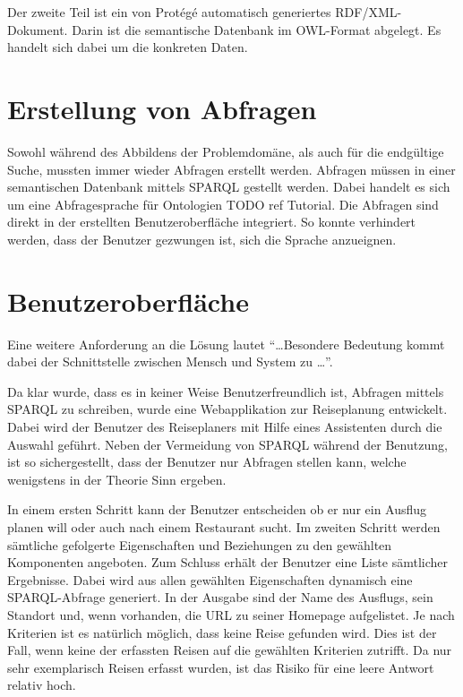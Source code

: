 Der zweite Teil ist ein von Protégé automatisch generiertes RDF/XML-Dokument. Darin ist die semantische Datenbank im OWL-Format abgelegt. Es handelt sich dabei um die konkreten Daten.

\section{Erstellung von Abfragen}
\label{sec:loesung_sparql}
Sowohl während des Abbildens der Problemdomäne, als auch für die endgültige Suche, mussten immer wieder Abfragen erstellt werden. Abfragen müssen in einer semantischen Datenbank mittels SPARQL gestellt werden. Dabei handelt es sich um eine Abfragesprache für Ontologien {\color{red} TODO ref Tutorial}. Die Abfragen sind direkt in der erstellten Benutzeroberfläche integriert. So konnte verhindert werden, dass der Benutzer gezwungen ist, sich die Sprache anzueignen.

\section{Benutzeroberfläche}
\label{sec:loesung_gui}
Eine weitere Anforderung an die Lösung lautet ``\ldots Besondere Bedeutung kommt dabei der Schnittstelle zwischen Mensch und System zu \ldots''.~\cite{Aufgabenstellung}

Da klar wurde, dass es in keiner Weise Benutzerfreundlich ist, Abfragen mittels SPARQL zu schreiben, wurde eine Webapplikation zur Reiseplanung entwickelt. Dabei wird der Benutzer des Reiseplaners mit Hilfe eines Assistenten durch die Auswahl geführt. Neben der Vermeidung von SPARQL während der Benutzung, ist so sichergestellt, dass der Benutzer nur Abfragen stellen kann, welche wenigstens in der Theorie Sinn ergeben.

In einem ersten Schritt kann der Benutzer entscheiden ob er nur ein Ausflug planen will oder auch nach einem Restaurant sucht. Im zweiten Schritt werden sämtliche gefolgerte Eigenschaften und Beziehungen zu den gewählten Komponenten angeboten. Zum Schluss erhält der Benutzer eine Liste sämtlicher Ergebnisse. Dabei wird aus allen gewählten Eigenschaften dynamisch eine SPARQL-Abfrage generiert. In der Ausgabe sind der Name des Ausflugs, sein Standort und, wenn vorhanden, die URL zu seiner Homepage aufgelistet. Je nach Kriterien ist es natürlich möglich, dass keine Reise gefunden wird. Dies ist der Fall, wenn keine der erfassten Reisen auf die gewählten Kriterien zutrifft. Da nur sehr exemplarisch Reisen erfasst wurden, ist das Risiko für eine leere Antwort relativ hoch.
